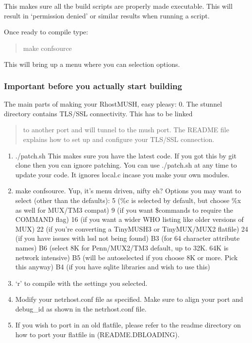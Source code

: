 \documentclass[letterpaper,10pt,english]{sphinxmanual}
\begin{document}
\sphinxAtStartPar
This makes sure all the build scripts are properly made executable.
This will result in ‘permission denied’ or similar results when running a script.

\sphinxAtStartPar
Once ready to compile type:
\begin{quote}

\sphinxAtStartPar
make confsource
\end{quote}

\sphinxAtStartPar
This will bring up a menu where you can selection options.


\subsubsection{Important before you actually start building}
\label{\detokenize{installation:important-before-you-actually-start-building}}
\sphinxAtStartPar
The main parts of making your RhostMUSH, easy pleasy:
0.  The stunnel directory contains TLS/SSL connectivity.  This has to be linked
\begin{quote}

\sphinxAtStartPar
to another port and will tunnel to the mush port.  The README file explains
how to set up and configure your TLS/SSL connection.
\end{quote}
\begin{enumerate}
%
\item {} 
\sphinxAtStartPar
./patch.sh \textendash{} This makes sure you have the latest code.
If you got this by git clone 
then you can ignore patching.  You can use ./patch.sh at any
time to update your code.  It ignores local.c incase you make
your own modules.

\item {} 
\sphinxAtStartPar
make confsource.  Yup, it’s menu driven, nifty eh?
Options you may want to select (other than the defaults):
5  (\%c is selected by default, but choose \%x as well for MUX/TM3 compat)
9  (if you want \$commands to require the COMMAND flag)
16 (if you want a wider WHO listing like older versions of MUX)
22 (if you’re converting a TinyMUSH3 or TinyMUX/MUX2 flatfile)
24 (if you have issues with \sphinxhyphen{}lssl not being found)
B3 (for 64 character attribute names)
B6 (select 8K for Penn/MUX2/TM3 default, up to 32K.  64K is network intensive)
B5 (will be autoselected if you choose 8K or more.  Pick this anyway)
B4 (if you have sqlite libraries and wish to use this)

\item {} 
\sphinxAtStartPar
‘r’ to compile with the settings you selected.

\item {} 
\sphinxAtStartPar
Modify your netrhost.conf file as specified.  Make sure to align
your port and debug\_id as shown in the netrhost.conf file.

\item {} 
\sphinxAtStartPar
If you wish to port in an old flatfile, please refer to the readme directory
on how to port your flatfile in (README.DBLOADING).

\end{enumerate}
\end{document}
